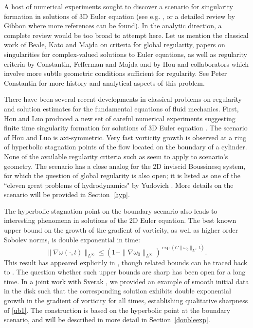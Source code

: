 \documentclass[reqno,centertags, 11pt]{amsart}
\begin{document}
A host of numerical experiments sought to discover a scenario for singularity formation in solutions of 3D Euler equation (see e.g. \cite{BNW,BorPel,EShu,GraSid,Hou1,Kerr,LPTW,OG,PG,PumSig},
or a detailed review by Gibbon \cite{Gibbon} where more references can be found). In the analytic direction, a complete review would be too broad to
attempt here. Let us mention the classical work of Beale, Kato and Majda \cite{BKM} on criteria for global regularity, papers \cite{Caf,Caf1} on singularities for
complex-valued solutions to Euler equations, as well as regularity criteria by Constantin, Fefferman and Majda \cite{CFM} and by Hou and collaborators \cite{Hou1,Hou11,DHY} which involve
more subtle geometric conditions sufficient for regularity. See Peter Constantin \cite{PC12} for more history and analytical aspects of this problem.

There have been several recent developments in classical problems on regularity and solution estimates for the fundamental equations of fluid mechanics.
First, Hou and Luo produced a new set of careful numerical experiments suggesting finite time singularity formation for solutions of 3D Euler equation \cite{HouLuo}.
The scenario of Hou and Luo is axi-symmetric. Very fast vorticity growth is observed at a ring of hyperbolic stagnation points of the flow
located on the boundary of a cylinder. None of the available regularity criteria such as \cite{CFM,Hou1,DHY,Hou11} seem to apply to scenario's geometry.
The scenario has a close analog for the 2D inviscid Boussinesq system, for which the question of global regularity is also open; it is listed as one of the
``eleven great problems of hydrodynamics" by Yudovich \cite{Yud2000}. More details on the scenario will be provided in Section~\ref{hyp}.

The hyperbolic stagnation point on the boundary scenario also leads to interesting phenomena in solutions of the 2D Euler equation. The best known upper bound on the growth of
the gradient of vorticity, as well as higher order Sobolev norms, is double exponential
in time:
\begin{equation}\label{ub1} \|\nabla \omega(\cdot, t)\|_{L^\infty} \leq \left(1+\|\nabla \omega_0\|_{L^\infty}\right)^{\exp(C\|\omega_0\|_{L^\infty}t)}. \end{equation}
This result has appeared explicitly in \cite{YudDE}, though related bounds can be traced back to \cite{Wolibner}.
The question whether such upper bounds are sharp has been open for a long time.
In a joint work with Sverak \cite{KS}, we provided an example of smooth initial data in the disk such that the corresponding solution %
exhibits double exponential growth in the gradient of vorticity for all times, establishing qualitative sharpness of \eqref{ub1}.
The construction is based on the hyperbolic point at the boundary scenario, and will be described in more detail in Section~\ref{doubleexp}.
\end{document}

